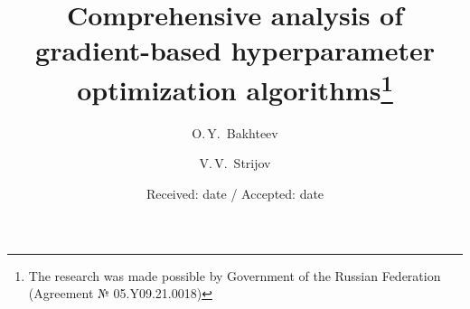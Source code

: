 \documentclass[smallcondensed]{svjour3}
\begin{document}




\title{Comprehensive analysis of gradient-based hyperparameter optimization algorithms\thanks{The research was made possible by Government of the Russian Federation (Agreement № 05.Y09.21.0018)}}%

\author{O.\,Y.~Bakhteev        \and
        V.\,V.~Strijov %
}


\date{Received: date / Accepted: date}


\maketitle




\end{document}
